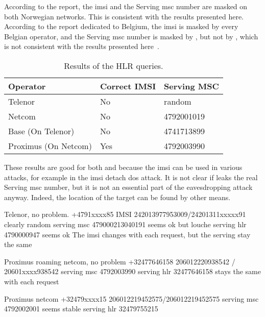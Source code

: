       According to the  report, the \gls{imsi} and the
      Serving \gls{msc} number are masked on both Norwegian networks.
      This is consistent with the results presented here. According to the
      report dedicated to Belgium, the \gls{imsi} is masked by every
      Belgian operator, and the Serving \gls{msc} number is masked by
      , but not by , which is not consistent
      with the results presented
      here~\cite{security_research_labs_mobile_2015-1}. 
      
      \begin{table}[h]
        \centering
        \begin{tabular}{@{}lll@{}}
          \toprule
          Operator             & Correct IMSI & Serving MSC\\
          \midrule
          Telenor              & No   & random     \\
          Netcom               & No   & 4792001019 \\
          Base (On Telenor)    & No   & 4741713899 \\            
          Proximus (On Netcom) & Yes  & 4792003990 \\
          \bottomrule
        \end{tabular}
        \caption{Results of the HLR queries.}
        \label{tab:hlr_queries}
      \end{table}
      
      These results are good for both  and 
      because the \gls{imsi} can be used in various attacks, for example
      in the \gls{imsi} detach \gls{dos} attack. It is not clear if
       leaks the real Serving \gls{msc} number, but it is
      not an essential part of the eavesdropping attack anyway. Indeed,
      the location of the target can be found by other means.

      \iffalse

      Telenor, no problem. +4791xxxx85
      IMSI 242013977953009/24201311xxxxx91 clearly random
      serving msc 479000213040191 seems ok but louche
      serving hlr 4790000947 seems ok
      The imsi changes with each request, but the serving stay the same

      Proximus roaming netcom, no problem +32477646158
      206012220938542 / 20601xxxx938542
      serving msc 4792003990
      serving hlr 32477646158
      stays the same with each request

      Proximus netcom +32479xxxx15
      206012219452575/206012219452575  
      serving msc 4792002001 seems stable
      serving hlr 32479755215


